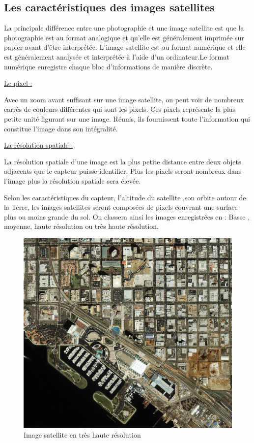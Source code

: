\documentclass[12pt, openany]{report}
\begin{document}
\subsection{Les caractéristiques des images satellites}
La principale différence entre une photographie et une image satellite est que la photographie est au format analogique et qu’elle est généralement imprimée sur papier avant d’être interprétée. L’image satellite est au format numérique et elle est généralement analysée et interprétée à l’aide d’un ordinateur.Le format numérique enregistre chaque bloc d’informations de manière discrète.


\par
\underline{Le pixel :}
\par

Avec un zoom avant suffisant sur une image satellite, on peut voir de nombreux carrés de couleurs différentes qui sont les pixels.
Ces pixels représente la plus petite unité figurant sur une image. Réunis, ils fournissent toute l’information qui constitue l’image dans son intégralité.

\par
\underline{La résolution spatiale :}
\par 

La résolution spatiale d’une image est la plus petite distance entre deux objets adjacents que le capteur puisse identifier.
Plus les pixels seront nombreux dans l’image plus la résolution spatiale sera élevée.
\par
Selon les caractéristiques du capteur, l’altitude du satellite ,son orbite autour de la Terre, les images satellites seront composées de pixels couvrant une surface plus ou moins grande du sol. On classera ainsi les images enregistrées en : Basse , moyenne, haute résolution ou très haute résolution.

\begin{figure}[H]
\centering
\includegraphics[scale=0.15]{resolution_image.jpg}
\caption{Image satellite en très haute résolution}
\end{figure}
\end{document}
